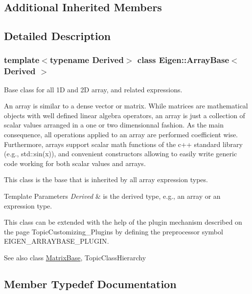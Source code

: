 \subsection*{Additional Inherited Members}


\subsection{Detailed Description}
\subsubsection*{template$<$typename Derived$>$\newline
class Eigen\+::\+Array\+Base$<$ Derived $>$}

Base class for all 1D and 2D array, and related expressions. 

An array is similar to a dense vector or matrix. While matrices are mathematical objects with well defined linear algebra operators, an array is just a collection of scalar values arranged in a one or two dimensionnal fashion. As the main consequence, all operations applied to an array are performed coefficient wise. Furthermore, arrays support scalar math functions of the c++ standard library (e.\+g., std\+::sin(x)), and convenient constructors allowing to easily write generic code working for both scalar values and arrays.

This class is the base that is inherited by all array expression types.


\begin{DoxyTemplParams}{Template Parameters}
{\em Derived} & is the derived type, e.\+g., an array or an expression type.\\
\hline
\end{DoxyTemplParams}
This class can be extended with the help of the plugin mechanism described on the page Topic\+Customizing\+\_\+\+Plugins by defining the preprocessor symbol {\ttfamily E\+I\+G\+E\+N\+\_\+\+A\+R\+R\+A\+Y\+B\+A\+S\+E\+\_\+\+P\+L\+U\+G\+IN}.

\begin{DoxySeeAlso}{See also}
class \mbox{\hyperlink{class_eigen_1_1_matrix_base}{Matrix\+Base}}, Topic\+Class\+Hierarchy 
\end{DoxySeeAlso}


\subsection{Member Typedef Documentation}
\mbox{\label{class_eigen_1_1_array_base_a7c296f02281624d9c76eb864ab7209ce}} 
